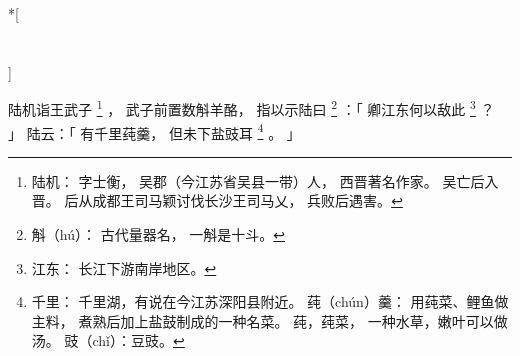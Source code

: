 
\switchcolumn[0]*[\section{}]

陆机诣王武子%
\footnote{%
    陆机：
        字士衡，
        吴郡（今江苏省吴县一带）人，
        西晋著名作家。
        吴亡后入晋。
        后从成都王司马颖讨伐长沙王司马乂，
        兵败后遇害。
}%
，
武子前置数斛羊酪，
指以示陆曰%
\footnote{%
    斛（hú）：
        古代量器名，
        一斛是十斗。
}%
：「
    卿江东何以敌此%
    \footnote{%
        江东：
            长江下游南岸地区。
    }%
    ？
」
陆云：「
    有千里莼羹，
    但未下盐豉耳%
    \footnote{%
        千里：
            千里湖，有说在今江苏深阳县附近。
        莼（chún）羹：
            用莼菜、鲤鱼做主料，
            煮熟后加上盐鼓制成的一种名菜。
            莼，莼菜，
            一种水草，嫩叶可以做汤。
            豉（chǐ）：豆豉。
    }%
    。
」

\switchcolumn




